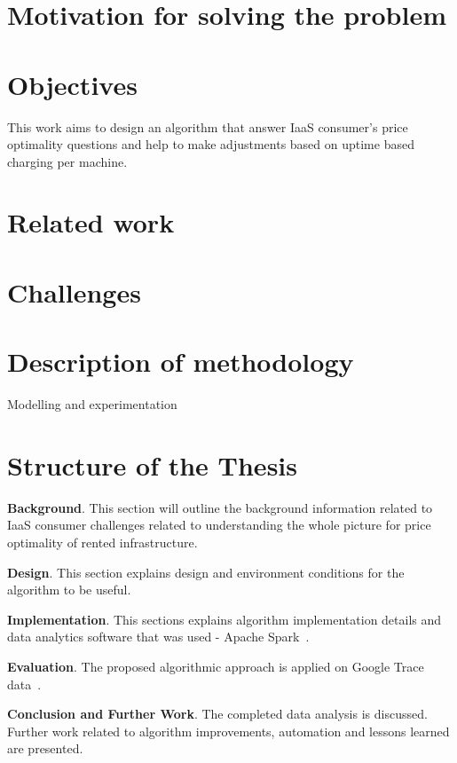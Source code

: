 \documentclass[]{final_report}
\begin{document}
\section{Motivation for solving the problem}

\section{Objectives}
This work aims to design an algorithm that answer IaaS consumer's price optimality questions and help to make adjustments based on uptime based charging per machine. 

\section{Related work}

\section{Challenges}

\section{Description of methodology}
Modelling and experimentation

\section{Structure of the Thesis}
\textbf{Background}. This section will outline the background information related to IaaS consumer challenges related to understanding the whole picture for price optimality of rented infrastructure. \par
\textbf{Design}. This section explains design and environment conditions for the algorithm to be useful. \par
\textbf{Implementation}. This sections explains algorithm implementation details and data analytics software that was used - Apache Spark~\cite{spark}. \par
\textbf{Evaluation}. The proposed algorithmic approach is applied on Google Trace data~\cite{googleTrace}. \par
\textbf{Conclusion and Further Work}. The completed data analysis is discussed. Further work related to algorithm improvements, automation and lessons learned are presented. 
 
\newpage

\end{document}
